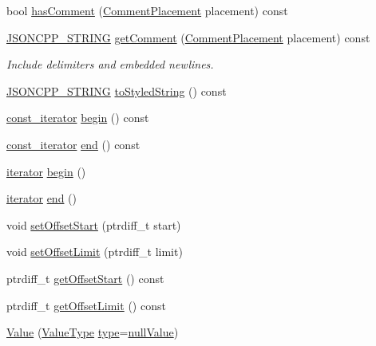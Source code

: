 \begin{DoxyCompactItemize}
bool \hyperlink{class_json_1_1_value_a65d8e3ab6a5871cbd019a3e0f0b944a3}{has\+Comment} (\hyperlink{namespace_json_a4fc417c23905b2ae9e2c47d197a45351}{Comment\+Placement} placement) const
\item 
\hyperlink{config_8h_a1e723f95759de062585bc4a8fd3fa4be}{J\+S\+O\+N\+C\+P\+P\+\_\+\+S\+T\+R\+I\+NG} \hyperlink{class_json_1_1_value_a82817229a986f0b254e31d5c83066ffe}{get\+Comment} (\hyperlink{namespace_json_a4fc417c23905b2ae9e2c47d197a45351}{Comment\+Placement} placement) const
\begin{DoxyCompactList}\small\item\em Include delimiters and embedded newlines. \end{DoxyCompactList}\item 
\hyperlink{config_8h_a1e723f95759de062585bc4a8fd3fa4be}{J\+S\+O\+N\+C\+P\+P\+\_\+\+S\+T\+R\+I\+NG} \hyperlink{class_json_1_1_value_a00154cc8662d7a845ed59e175c2496cb}{to\+Styled\+String} () const
\item 
\hyperlink{class_json_1_1_value_af92282ca92b58b320debd486afb7696a}{const\+\_\+iterator} \hyperlink{class_json_1_1_value_a015459a3950c198d63a2d3be8f5ae296}{begin} () const
\item 
\hyperlink{class_json_1_1_value_af92282ca92b58b320debd486afb7696a}{const\+\_\+iterator} \hyperlink{class_json_1_1_value_a3e443cd0ef24f7e028b175e47ee045e0}{end} () const
\item 
\hyperlink{class_json_1_1_value_a341cdf2e01f8b3c5b7317aa2f0768c53}{iterator} \hyperlink{class_json_1_1_value_a2d45bb2e68e8f22fe356d7d955ebd3c9}{begin} ()
\item 
\hyperlink{class_json_1_1_value_a341cdf2e01f8b3c5b7317aa2f0768c53}{iterator} \hyperlink{class_json_1_1_value_a2f961eff73f7f79cd29260b6cbd42558}{end} ()
\item 
void \hyperlink{class_json_1_1_value_a92e32ea0f4f8a15853a3cf0beac9feb9}{set\+Offset\+Start} (ptrdiff\+\_\+t start)
\item 
void \hyperlink{class_json_1_1_value_a5e4f5853fec138150c5df6004a8c2bcf}{set\+Offset\+Limit} (ptrdiff\+\_\+t limit)
\item 
ptrdiff\+\_\+t \hyperlink{class_json_1_1_value_afa081dc764000951a1d8d6148155508e}{get\+Offset\+Start} () const
\item 
ptrdiff\+\_\+t \hyperlink{class_json_1_1_value_a2cdfa01935f87fcace90d450cbd2c0a4}{get\+Offset\+Limit} () const
\item 
\hyperlink{class_json_1_1_value_ada6ba1369448fb0240bccc36efaa46f7}{Value} (\hyperlink{namespace_json_a7d654b75c16a57007925868e38212b4e}{Value\+Type} \hyperlink{class_json_1_1_value_a8ce61157a011894f0252ceed232312de}{type}=\hyperlink{namespace_json_a7d654b75c16a57007925868e38212b4ea99922f3ccd58446e80e6055a7119b640}{null\+Value})

\end{DoxyCompactItemize}
